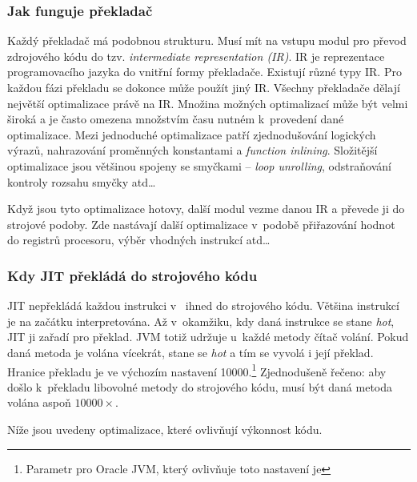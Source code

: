 \subsubsection{Jak funguje překladač}
Každý překladač má podobnou strukturu.
Musí mít na vstupu modul pro převod zdrojového kódu do tzv. \emph{intermediate representation (IR)}.
IR je reprezentace programovacího jazyka do vnitřní formy překladače.
Existují různé typy IR. Pro každou fázi překladu se dokonce může použít jiný IR.
Všechny překladače dělají největší optimalizace právě na IR.
Množina možných optimalizací může být velmi široká a je často omezena množstvím času nutném k~provedení dané optimalizace.
Mezi jednoduché optimalizace patří zjednodušování logických výrazů, nahrazování proměnných konstantami a \emph{function inlining}.
Složitější optimalizace jsou většinou spojeny se smyčkami -- \emph{loop unrolling}, odstraňování kontroly rozsahu smyčky atd\ldots{}

Když jsou tyto optimalizace hotovy, další modul vezme danou IR a převede ji do strojové podoby. Zde nastávají další optimalizace v~podobě přiřazování hodnot do registrů procesoru, výběr vhodných instrukcí atd\ldots{}

\subsubsection{Kdy JIT překládá do strojového kódu\label{subsub:whenJIT}}
JIT nepřekládá každou instrukci v~\bytecode{} ihned do strojového kódu. Většina instrukcí je na začátku interpretována. Až v~okamžiku, kdy daná instrukce se stane \emph{hot}, JIT ji zařadí pro překlad. JVM totiž udržuje u~každé metody čítač volání. Pokud daná metoda je volána vícekrát, stane se \emph{hot} a tím se vyvolá i její překlad. Hranice překladu je ve výchozím nastavení \num{10000}.\footnote{Parametr pro Oracle JVM, který ovlivňuje toto nastavení je } Zjednodušeně řečeno: aby došlo k~překladu libovolné metody do strojového kódu, musí být daná metoda volána aspoň $\num{10000}\times$.

Níže jsou uvedeny optimalizace, které ovlivňují výkonnost kódu.

